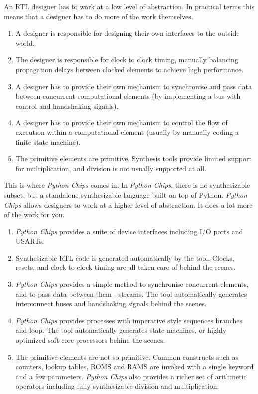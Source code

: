 \documentclass[letterpaper,10pt,english]{manual}
\begin{document}
An RTL designer has to work at a low level of abstraction. In practical
terms this means that a designer has to do more of the work themselves.
\begin{enumerate}
\item {} 
A designer is responsible for designing their own interfaces to
the outside world.

\item {} 
The designer is responsible for clock to clock timing, manually
balancing propagation delays between clocked elements to achieve
high performance.

\item {} 
A designer has to provide their own mechanism to synchronise and
pass data between concurrent computational elements (by
implementing a bus with control and handshaking signals).

\item {} 
A designer has to provide their own mechanism to control the flow
of execution within a computational element (usually by manually
coding a finite state machine).

\item {} 
The primitive elements are primitive. Synthesis tools provide
limited support for multiplication, and division is not usually
supported at all.

\end{enumerate}

This is where \emph{Python Chips} comes in. In \emph{Python Chips}, there is no
synthesizable subset, but a standalone synthesizable language built on top
of Python. \emph{Python Chips} allows designers to work at a higher level of
abstraction. It does a lot more of the work for you.
\begin{enumerate}
\item {} 
\emph{Python Chips} provides a suite of device interfaces including
I/O ports and USARTs.

\item {} 
Synthesizable RTL code is generated automatically by the tool.
Clocks, resets, and clock to clock timing are all taken care of
behind the scenes.

\item {} 
\emph{Python Chips} provides a simple method to synchronise concurrent
elements, and to pass data between them - streams. The tool
automatically generates interconnect buses and handshaking
signals behind the scenes.

\item {} 
\emph{Python Chips} provides processes with imperative style
sequences branches and loop. The tool automatically generates
state machines, or highly optimized soft-core processors behind
the scenes.

\item {} 
The primitive elements are not so primitive. Common constructs
such as counters, lookup tables, ROMS and RAMS are invoked with a
single keyword and a few parameters. \emph{Python Chips} also provides
a richer set of arithmetic operators including fully
synthesizable division and multiplication.

\end{enumerate}
\end{document}
